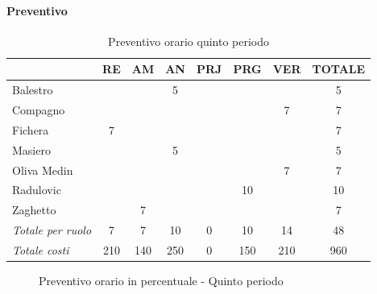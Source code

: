 \documentclass[a4paper,12pt]{article}
\begin{document}
            \paragraph{Preventivo}
                \begin{table}[H]
                \centering
                \begin{tabular}{|l|c|c|c|c|c|c|c|}
                \hline
                    \rowcolor{lightgray}{\textbf{Membro}} & {\textbf{RE}} & {\textbf{AM}} & {\textbf{AN}} & {\textbf{PRJ}} & {\textbf{PRG}} & {\textbf{VER}} & {\textbf{TOTALE}}\\
                \hline
                    Balestro & & & 5 & & & & 5\\
                \hline
                    Compagno & & & & & & 7 & 7\\
                \hline
                    Fichera & 7 & & & & & & 7\\
                \hline
                    Masiero & & & 5 & & & & 5\\
                \hline
                    Oliva Medin & & & & & & 7 & 7\\
                \hline
                    Radulovic & & & & & 10 & & 10\\
                \hline
                    Zaghetto & & 7 & & & & & 7\\
                \hline
                    \rowcolor{lightgray}\textit{Totale per ruolo} & 7 & 7 & 10 & 0 & 10 & 14 & 48\\
                \hline
                    \rowcolor{lightgray}\textit{Totale costi} & 210 & 140 & 250 & 0 & 150 & 210 & 960\\
                \hline
                \end{tabular}
                \caption{Preventivo orario quinto periodo}
                \end{table}

                \begin{figure}[H]
                \centering
                \caption{Preventivo orario in percentuale - Quinto periodo}
                \end{figure}
                
\end{document}
